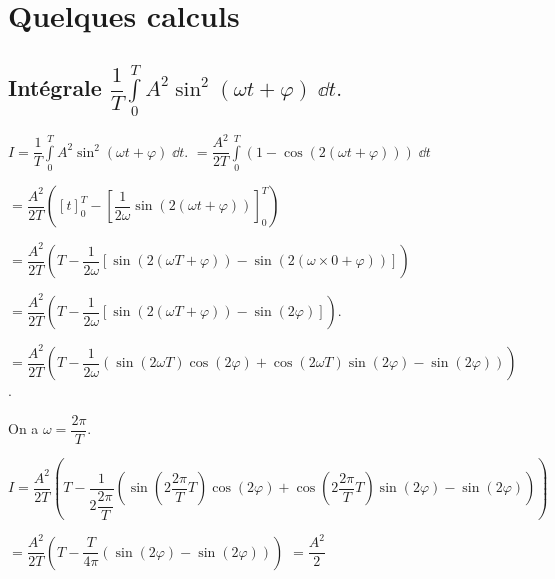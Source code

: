 \section{Quelques calculs}

\subsection{Intégrale $\dfrac{1}{T} \int\limits_{0}^{T} A^2 \sin^2(\omega t + \varphi)\; \dd t.$ \label{calcul:01}}

$I = \dfrac{1}{T} \int\limits_{0}^{T} A^2 \sin^2(\omega t + \varphi)\; \dd t.$
$= \dfrac{ A^2}{2 T} \int\limits_{0}^{T} \left( 1 - \cos\left( 2\left(\omega t + \varphi\right)\right)\right)\; \dd t$


$= {\dfrac{ A^2}{2 T}\left( \left[t\right]_{0}^{T} -  \left[\dfrac{1}{2\omega}\sin\left( 2\left(\omega t + \varphi\right)\right)\right]_{0}^{T}  \right)}$

$= {\dfrac{ A^2}{2 T}\left( T -  \dfrac{1}{2\omega}\left[
\sin\left( 2\left(\omega T + \varphi\right)\right)
- \sin\left( 2\left(\omega \times 0 + \varphi\right)\right)\right]  \right)}$

$= {\dfrac{ A^2}{2 T}\left( T -  \dfrac{1}{2\omega}\left[
\sin\left( 2\left(\omega T + \varphi\right)\right)
- \sin\left( 2 \varphi\right)\right]  \right)}$. 

$= {\dfrac{ A^2}{2 T}\left( T -  \dfrac{1}{2\omega}\left(
\sin\left( 2\omega T \right)\cos\left( 2\varphi\right)
+\cos\left( 2\omega T \right)\sin\left( 2\varphi\right)
- \sin\left( 2 \varphi\right)\right)  \right)}$. 

On a $\omega = \dfrac{2\pi}{T}$.

$I= {\dfrac{ A^2}{2 T}\left( T -  \dfrac{1}{2\dfrac{2\pi}{T}}\left(
\sin\left( 2\dfrac{2\pi}{T} T \right)\cos\left( 2\varphi\right)
+\cos\left( 2\dfrac{2\pi}{T} T \right)\sin\left( 2\varphi\right)
- \sin\left( 2 \varphi\right)\right)  \right)}$ 

$ = \dfrac{ A^2}{2 T}\left( T -  \dfrac{T}{4\pi}\left(
\sin\left( 2\varphi\right) - \sin\left( 2 \varphi\right)\right)  \right) $
$ =\dfrac{A^2}{2}$





